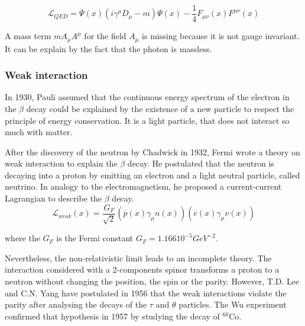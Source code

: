     \begin{equation}
    	\mathcal{L}_{QED} =  \overline{\Psi}\left(x\right)\left( i \gamma^\mu D_\mu - m \right) \Psi\left(x\right) - \frac{1}{4}F_{\mu \nu}\left(x\right) F^{\mu \nu}\left(x\right)
    \end{equation}

    A mass term $m A_{\mu} A^{\mu}$ for the field $A_{\mu}$ is missing because it is not gauge invariant. It can be explain by the fact that the photon is massless.


    \subsubsection{Weak interaction}

    In 1930, Pauli assumed that the continuous energy spectrum of the electron in the $\beta$ decay could be explained by the existence of a new particle to respect the principle of energy conservation. 
    It is a light particle, that does not interact so much with matter.

    After the discovery of the neutron by Chadwick in 1932, Fermi wrote a theory on weak interaction to explain the $\beta$ decay. 
    He postulated that the neutron is decaying into a proton by emitting an electron and a light neutral particle, called neutrino.
    In analogy to the electromagnetism, he proposed a current-current Lagrangian to describe the $\beta$ decay.
    \begin{equation}
\mathcal{L}_{weak}(x) = \frac{G_F}{\sqrt{2}}\left(\overline{p}(x) \gamma_{\mu} n(x) \right) \left(\overline{e}(x) \gamma_{\mu} \nu(x) \right)
    \end{equation}

    where the $G_F$ is the Fermi constant $G_F = 1.166 \dot 10^{-5} GeV^{-2}$. 
    
    Nevertheless, the non-relativistic limit leads to an incomplete theory.
    The interaction considered with a 2-components spinor transforms a proton to a neutron without changing the position, the spin or the parity.
    However, T.D. Lee and C.N. Yang have postulated in 1956 that the weak interactions violate the parity after analysing the decays of the $\tau$ and $\theta$ particles.     
    The Wu experiment  confirmed that hypothesis in 1957 by studying the decay of $^{60}$Co.


